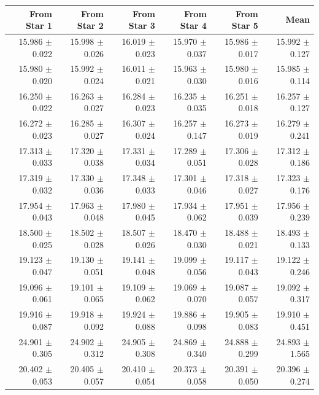 \documentclass{tda}
\begin{document}
	\begin{table}
		\centering
		\begin{tabular} {r r r r r r}
			\toprule
			\textbf{From Star 1} & \textbf{From Star 2} & \textbf{From Star 3} & \textbf{From Star 4} & \textbf{From Star 5} & \textbf{Mean}\\
			\midrule
			15.986 \(\pm\) 0.022 & 15.998 \(\pm\) 0.026 & 16.019 \(\pm\) 0.023 & 15.970 \(\pm\) 0.037 & 15.986 \(\pm\) 0.017 & 15.992 \(\pm\) 0.127 \\
			15.980 \(\pm\) 0.020 & 15.992 \(\pm\) 0.024 & 16.011 \(\pm\) 0.021 & 15.963 \(\pm\) 0.030 & 15.980 \(\pm\) 0.016 & 15.985 \(\pm\) 0.114 \\
			16.250 \(\pm\) 0.022 & 16.263 \(\pm\) 0.027 & 16.284 \(\pm\) 0.023 & 16.235 \(\pm\) 0.035 & 16.251 \(\pm\) 0.018 & 16.257 \(\pm\) 0.127 \\
			16.272 \(\pm\) 0.023 & 16.285 \(\pm\) 0.027 & 16.307 \(\pm\) 0.024 & 16.257 \(\pm\) 0.147 & 16.273 \(\pm\) 0.019 & 16.279 \(\pm\) 0.241 \\
			17.313 \(\pm\) 0.033 & 17.320 \(\pm\) 0.038 & 17.331 \(\pm\) 0.034 & 17.289 \(\pm\) 0.051 & 17.306 \(\pm\) 0.028 & 17.312 \(\pm\) 0.186 \\
			17.319 \(\pm\) 0.032 & 17.330 \(\pm\) 0.036 & 17.348 \(\pm\) 0.033 & 17.301 \(\pm\) 0.046 & 17.318 \(\pm\) 0.027 & 17.323 \(\pm\) 0.176 \\
			17.954 \(\pm\) 0.043 & 17.963 \(\pm\) 0.048 & 17.980 \(\pm\) 0.045 & 17.934 \(\pm\) 0.062 & 17.951 \(\pm\) 0.039 & 17.956 \(\pm\) 0.239 \\
			18.500 \(\pm\) 0.025 & 18.502 \(\pm\) 0.028 & 18.507 \(\pm\) 0.026 & 18.470 \(\pm\) 0.030 & 18.488 \(\pm\) 0.021 & 18.493 \(\pm\) 0.133 \\
			19.123 \(\pm\) 0.047 & 19.130 \(\pm\) 0.051 & 19.141 \(\pm\) 0.048 & 19.099 \(\pm\) 0.056 & 19.117 \(\pm\) 0.043 & 19.122 \(\pm\) 0.246 \\
			19.096 \(\pm\) 0.061 & 19.101 \(\pm\) 0.065 & 19.109 \(\pm\) 0.062 & 19.069 \(\pm\) 0.070 & 19.087 \(\pm\) 0.057 & 19.092 \(\pm\) 0.317 \\
			19.916 \(\pm\) 0.087 & 19.918 \(\pm\) 0.092 & 19.924 \(\pm\) 0.088 & 19.886 \(\pm\) 0.098 & 19.905 \(\pm\) 0.083 & 19.910 \(\pm\) 0.451 \\
			24.901 \(\pm\) 0.305 & 24.902 \(\pm\) 0.312 & 24.905 \(\pm\) 0.308 & 24.869 \(\pm\) 0.340 & 24.888 \(\pm\) 0.299 & 24.893 \(\pm\) 1.565 \\
			20.402 \(\pm\) 0.053 & 20.405 \(\pm\) 0.057 & 20.410 \(\pm\) 0.054 & 20.373 \(\pm\) 0.058 & 20.391 \(\pm\) 0.050 & 20.396 \(\pm\) 0.274 \\

\end{tabular}
\end{table}
\end{document}
